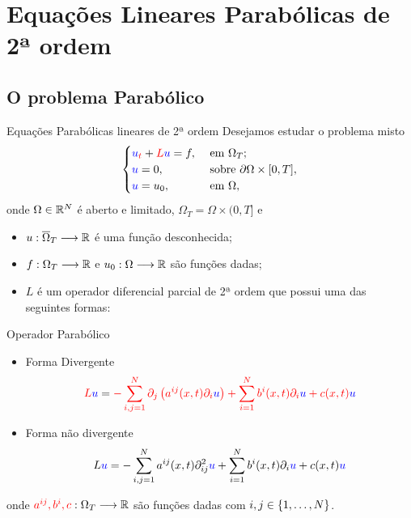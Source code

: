 \section{Equações Lineares Parabólicas de 2ª ordem}


\subsection*{O problema Parabólico}
\begin{frame}{Equações Parabólicas lineares de 2ª ordem}
Desejamos estudar o problema misto
\[
\begin{cases}
{\color{blue}u}{_{\color{red}t}}+{\color{red}L}{\color{blue}u}=f, & \text{ em } \Omega_T;\\
{\color{blue}u}=0, & \text{ sobre } \partial \Omega\times [0,T],\\
{\color{blue}u}=u_0, & \text{ em } \Omega,
\end{cases}
\]
onde \(\Omega\in \mathbb{R}^N\) é aberto e limitado, \(\Omega_T=\Omega\times (0,T]\) e 
\begin{itemize}
\item {\color{blue}\(u:\overline{\Omega}_T\longrightarrow \mathbb{R}\)}
é uma função desconhecida;
\item {\color{cyan}\(f:\Omega_T \longrightarrow \mathbb{R}\) e \(u_0:\Omega \longrightarrow \mathbb{R}\)} são funções dadas;
\item {\color{red}\(L\)} é um operador diferencial parcial de 2ª ordem que possui uma das seguintes formas:
\end{itemize}
\end{frame}
\begin{frame}{Operador Parabólico}
\begin{itemize}
\item Forma Divergente
\[
{\color{red}L}{\color{blue}u}=
{\color{red}-\sum_{i,j=1}^{N}
\partial_j\left(a^{ij}(x,t)\partial_i {\color{blue}u}\right)
+\sum_{i=1}^{N}{\color{red}b^i(x,t)}\partial_i{\color{blue}u}
+c(x,t){\color{blue}u}}
\]

\item Forma não divergente
{\color{red}
\[
L{\color{blue}u}=-\sum_{i,j=1}^{N}a^{ij}(x,t)\partial^2_{ij}{\color{blue}u}
+\sum_{i=1}^{N}b^i(x,t)\partial_i{\color{blue}u}+c(x,t){\color{blue}u}
\]
}
\end{itemize}
onde \({\color{red}a^{ij},b^i, c} :\Omega_T \longrightarrow \mathbb{R}\) são funções dadas com \(i,j\in \{1,\ldots,N\}\).
\end{frame}

